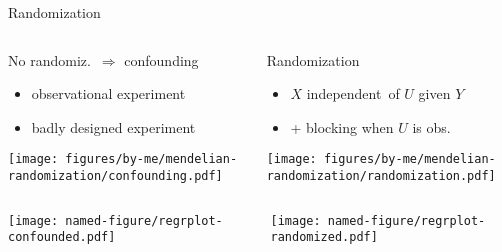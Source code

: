 \documentclass{beamer}
\begin{document}
\begin{frame}{Randomization}
\begin{columns}[t]
\begin{column}{0.5\textwidth}
No randomiz.~$\Rightarrow$ confounding
\begin{itemize}
\item observational experiment
\item badly designed experiment
\end{itemize}

\texttt{[image: figures/by-me/mendelian-randomization/confounding.pdf]}
\end{column}

\begin{column}{0.5\textwidth}
Randomization
\begin{itemize}
\item $X$ independent~of $U$ given $Y$
\item + blocking when $U$ is obs.
\end{itemize}

\texttt{[image: figures/by-me/mendelian-randomization/randomization.pdf]}
\end{column}
\end{columns}
\vfill
\begin{columns}[t]
\begin{column}{0.5\textwidth}
\texttt{[image: named-figure/regrplot-confounded.pdf]}
\end{column}

\begin{column}{0.5\textwidth}
\texttt{[image: named-figure/regrplot-randomized.pdf]}
\end{column}
\end{columns}
\end{frame}
\end{document}
